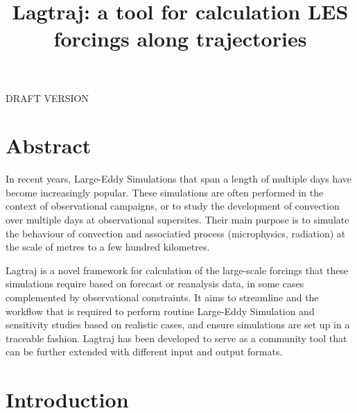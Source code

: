 \documentclass[a4paper,11pt]{article}
\title{Lagtraj: a tool for calculation LES forcings along trajectories}
\begin{document}
\maketitle

DRAFT VERSION

\section*{Abstract}

In recent years, Large-Eddy Simulations that span a length of
multiple days have become increasingly popular. These simulations are
often performed in the context of observational campaigns, or to study
the development of convection over multiple days at observational
supersites. Their main purpose is to simulate the behaviour of
convection and associatied process (microphysics, radiation) at the
scale of metres to a few hundred kilometres.


Lagtraj is a novel framework for calculation of the large-scale
forcings that these simulations require based on forecast or reanalysis
data, in some cases complemented by observational constraints. It aims
to streamline and the workflow that is required to perform routine
Large-Eddy Simulation and sensitivity studies based on realistic cases,
and ensure simulations are set up in a traceable fashion. Lagtraj has
been developed to serve as a community tool that can be further
extended with different input and output formats.

\section{Introduction}
\end{document}

